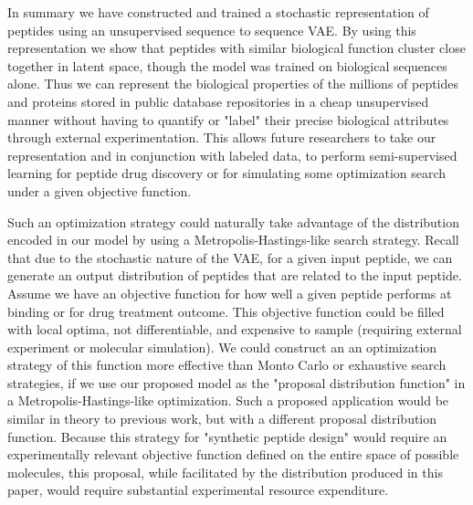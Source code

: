 \documentclass[final,1p,times,twocolumn]{elsarticle}
\begin{document}
In summary we have constructed and trained a stochastic representation of peptides using an unsupervised sequence to sequence VAE. By using this representation we show that peptides with similar biological function cluster close together in latent space, though the model was trained on biological sequences alone. Thus we can represent the biological properties of the millions of peptides and proteins stored in public database repositories in a cheap unsupervised manner without having to quantify or "label" their precise biological attributes through external experimentation. This allows future researchers to take our representation and in conjunction with labeled data, to perform semi-supervised learning for peptide drug discovery or for simulating some optimization search under a given objective function.

Such an optimization strategy could naturally take advantage of the distribution encoded in our model by using a Metropolis-Hastings-like search strategy. Recall that due to the stochastic nature of the VAE, for a given input peptide, we can generate an output distribution of peptides that are related to the input peptide. Assume we have an objective function for how well a given peptide performs at binding or for drug treatment outcome. This objective function could be filled with local optima, not differentiable, and expensive to sample (requiring external experiment or molecular simulation). We could construct an an optimization strategy of this function more effective than Monto Carlo or exhaustive search strategies, if we use our proposed model as the "proposal distribution function" in a Metropolis-Hastings-like optimization. Such a proposed application would be similar in theory to previous work, but with a different proposal distribution function\cite{giguere2013improved}. Because this strategy for "synthetic peptide design" would require an experimentally relevant objective function defined on the entire space of possible molecules, this proposal, while facilitated by the distribution produced in this paper, would require substantial experimental resource expenditure.









\end{document}
